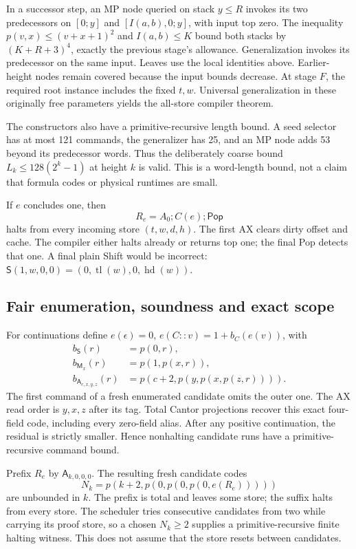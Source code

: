 In a successor step, an MP node queried on stack $y\le R$ invokes
its two predecessors on $[0;y]$ and $[I(a,b),0;y]$, with input top zero.
The inequality $p(v,x)\le(v+x+1)^2$ and $I(a,b)\le K$ bound both
stacks by $(K+R+3)^4$, exactly the previous stage's allowance.
Generalization invokes its predecessor on the same input. Leaves use
the local identities above. Earlier-height nodes remain covered because
the input bounds decrease. At stage $F$, the required root instance
includes the fixed $t,w$. Universal generalization in these originally
free parameters yields the all-store compiler theorem.

The constructors also have a primitive-recursive length bound. A seed
selector has at most 121 commands, the generalizer has 25, and an MP
node adds 53 beyond its predecessor words. Thus the deliberately coarse
bound $L_k\le128(2^k-1)$ at height $k$ is valid. This is a word-length
bound, not a claim that formula codes or physical runtimes are small.

If $e$ concludes one, then
\[
 R_e=A_0;C(e);\mathsf{Pop}
\]
halts from every incoming store $(t,w,d,h)$. The first AX clears dirty
offset and cache. The compiler either halts already or returns top one;
the final Pop detects that one. A final plain Shift would be incorrect:
$\mathsf S(1,w,0,0)=(0,\operatorname{tl}(w),0,\operatorname{hd}(w))$.

\subsection{Fair enumeration, soundness and exact scope}

For continuations define $e(\epsilon)=0$,
$e(C::v)=1+b_C(e(v))$, with
\begin{align*}
 b_{\mathsf S}(r)&=p(0,r),\\
 b_{\mathsf M_x}(r)&=p(1,p(x,r)),\\
 b_{\mathsf A_{c,x,y,z}}(r)&=p(c+2,p(y,p(x,p(z,r)))).
\end{align*}
The first command of a fresh enumerated candidate omits the outer one.
The AX read order is $y,x,z$ after its tag. Total Cantor projections
recover this exact four-field code, including every zero-field alias.
After any positive continuation, the residual is strictly smaller.
Hence nonhalting candidate runs have a primitive-recursive command bound.

Prefix $R_e$ by $\mathsf A_{k,0,0,0}$. The resulting fresh candidate
codes
\[
 N_k=p(k+2,p(0,p(0,p(0,e(R_e)))))
\]
are unbounded in $k$. The prefix is total and leaves some store; the
suffix halts from every store. The scheduler tries consecutive candidates
from two while carrying its proof store, so a chosen $N_k\ge2$ supplies
a primitive-recursive finite halting witness. This does not assume that
the store resets between candidates.

